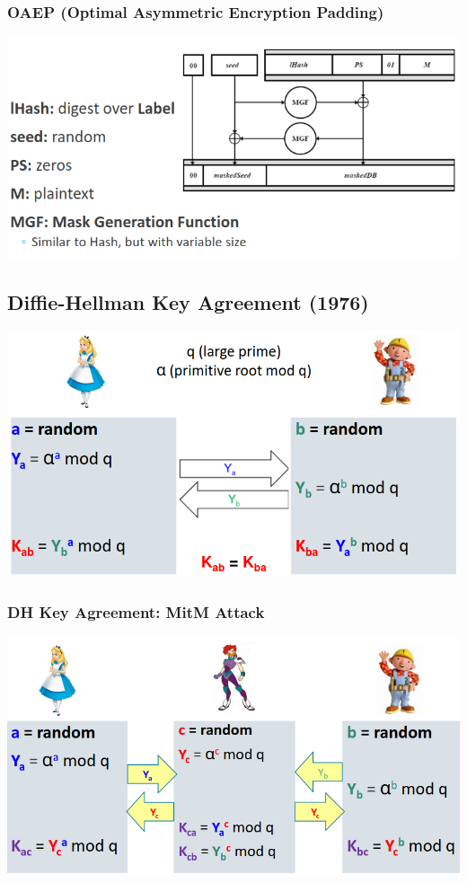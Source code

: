 \documentclass{article}
\begin{document}
\subsubsection{OAEP (Optimal Asymmetric Encryption Padding)}

\begin{center}
  \includegraphics[scale=0.4]{5}
\end{center}

\subsection{Diffie-Hellman Key Agreement (1976)}

\begin{center}
  \includegraphics[scale=0.3]{6}
\end{center}

\subsubsection{DH Key Agreement: MitM Attack}

\begin{center}
  \includegraphics[scale=0.3]{7}
\end{center}
\end{document}
